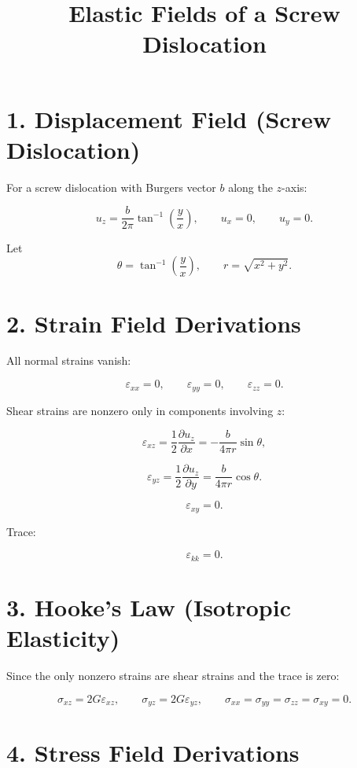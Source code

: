 \documentclass[12pt]{article}
\begin{document}
\title{Elastic Fields of a Screw Dislocation}
\author{}
\date{}
\maketitle

\section*{1. Displacement Field (Screw Dislocation)}

For a screw dislocation with Burgers vector $b$ along the $z$-axis:

\[
u_z = \frac{b}{2\pi}\tan^{-1}\!\left(\frac{y}{x}\right),
\qquad
u_x = 0, \qquad u_y = 0.
\]

Let
\[
\theta = \tan^{-1}\!\left(\frac{y}{x}\right), \qquad
r = \sqrt{x^2+y^2}.
\]


\section*{2. Strain Field Derivations}

All normal strains vanish:

\[
\varepsilon_{xx} = 0, \qquad
\varepsilon_{yy} = 0, \qquad
\varepsilon_{zz} = 0.
\]

Shear strains are nonzero only in components involving $z$:

\[
\varepsilon_{xz}
= \frac{1}{2}\frac{\partial u_z}{\partial x}
= -\frac{b}{4\pi r}\sin\theta,
\]

\[
\varepsilon_{yz}
= \frac{1}{2}\frac{\partial u_z}{\partial y}
= \frac{b}{4\pi r}\cos\theta.
\]

\[
\varepsilon_{xy} = 0.
\]

Trace:

\[
\varepsilon_{kk} = 0.
\]

\section*{3. Hooke's Law (Isotropic Elasticity)}

Since the only nonzero strains are shear strains and the trace is zero:

\[
\sigma_{xz} = 2G\varepsilon_{xz},
\qquad
\sigma_{yz} = 2G\varepsilon_{yz},
\qquad
\sigma_{xx} = \sigma_{yy} = \sigma_{zz} = \sigma_{xy} = 0.
\]

\newpage
\section*{4. Stress Field Derivations}
\end{document}
